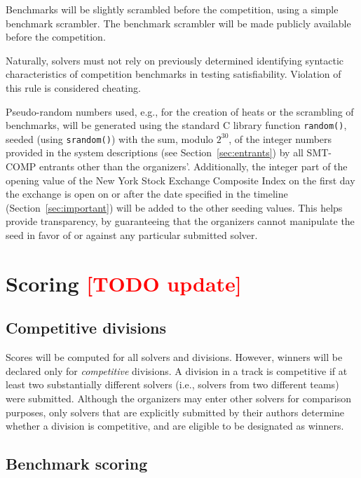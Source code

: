 \documentclass[12pt]{article}
\newcommand{\rem}[1]{\textcolor{red}{[#1]}}
\newcommand{\todo}[1]{\rem{TODO #1}}
\begin{document}
%
Benchmarks will be slightly scrambled before the competition, using a
simple benchmark scrambler.  The benchmark scrambler will be made
publicly available before the competition.

Naturally, solvers must not rely on previously determined identifying
syntactic characteristics of competition benchmarks in testing
satisfiability.  Violation of this rule is considered cheating.

%
Pseudo-random numbers used, e.g., for the creation of heats or the
scrambling of benchmarks, will be generated using the standard C
library function \texttt{random()}, seeded (using \texttt{srandom()})
with the sum, modulo $2^{30}$, of the integer numbers provided in the
system descriptions (see Section~\ref{sec:entrants}) by all SMT-COMP
entrants other than the organizers'.  Additionally, the integer part
of the opening value of the New York Stock Exchange Composite Index on
the first day the exchange is open on or after the date specified in
the timeline (Section~\ref{sec:important}) will be added to the other
seeding values.  This helps provide transparency, by guaranteeing that
the organizers cannot manipulate the seed in favor of or against any
particular submitted solver.


\section{Scoring \todo{update}}
\label{sec:scoring}

\subsection{Competitive divisions}

Scores will be computed for all solvers and divisions.  However,
winners will be declared only for \emph{competitive} divisions.  A
division in a track is competitive if at least two substantially
different solvers (i.e., solvers from two different teams) were
submitted.  Although the organizers may enter other solvers for
comparison purposes, only solvers that are explicitly submitted by
their authors determine whether a division is competitive, and are
eligible to be designated as winners.

\subsection{Benchmark scoring}
\label{sec:benchmark-scoring}
\end{document}
